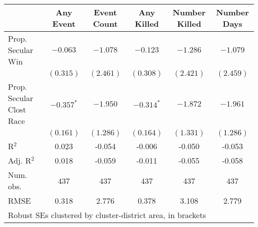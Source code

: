 
\begin{tabular}{l c c c c c }
\hline
 & Any Event & Event Count & Any Killed & Number Killed & Number Days \\
\hline
Prop. Secular Win        & $-0.063$     & $-1.078$  & $-0.123$     & $-1.286$  & $-1.079$  \\
                         & $(0.315)$    & $(2.461)$ & $(0.308)$    & $(2.421)$ & $(2.459)$ \\
Prop. Secular Clost Race & $-0.357^{*}$ & $-1.950$  & $-0.314^{*}$ & $-1.872$  & $-1.961$  \\
                         & $(0.161)$    & $(1.286)$ & $(0.164)$    & $(1.331)$ & $(1.286)$ \\
\hline
R$^2$                    & 0.023        & -0.054    & -0.006       & -0.050    & -0.053    \\
Adj. R$^2$               & 0.018        & -0.059    & -0.011       & -0.055    & -0.058    \\
Num. obs.                & 437          & 437       & 437          & 437       & 437       \\
RMSE                     & 0.318        & 2.776     & 0.378        & 3.108     & 2.779     \\
\hline
\multicolumn{6}{l}{\scriptsize{Robust SEs clustered by cluster-district area, in brackets}}
\end{tabular}
